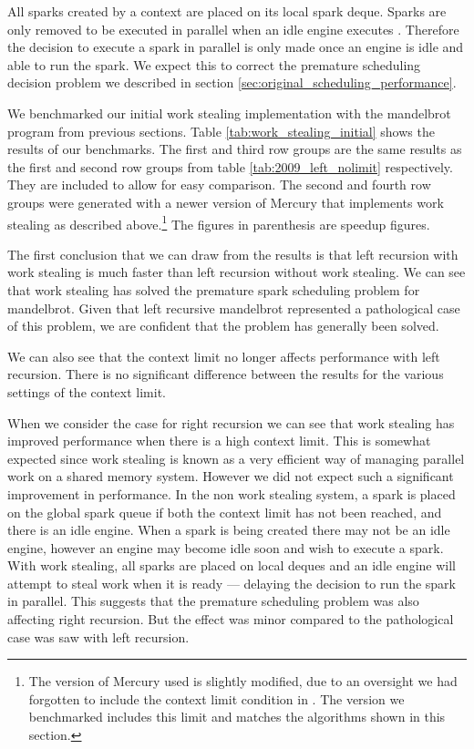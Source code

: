 All sparks created by a context are placed on its local spark deque.
Sparks are only removed to be executed in parallel when an idle engine
executes \trystealspark.
Therefore
the decision to execute a spark in parallel is only made once an engine is
idle and able to run the spark.
We expect this to correct the premature scheduling decision problem we
described in section \ref{sec:original_scheduling_performance}.



We benchmarked our initial work stealing implementation with the mandelbrot
program from previous sections.
Table \ref{tab:work_stealing_initial} shows the results of our benchmarks.
The first and third row groups are the same results as the first and second
row groups from table \ref{tab:2009_left_nolimit} respectively.
They are included to allow for easy comparison.
The second and fourth row groups were generated with a newer version of
Mercury that implements work stealing as described above.\footnote{
    The version of Mercury used is slightly modified,
    due to an oversight we had forgotten to include the context limit
    condition in \idle.
    The version we benchmarked includes this limit and matches the
    algorithms shown in this section.}
The figures in parenthesis are speedup figures.

The first conclusion that we can draw from the results is that
left recursion with work stealing is much faster than left recursion without
work stealing.
We can see that work stealing has solved the premature spark scheduling problem
for mandelbrot.
Given that left recursive mandelbrot represented a pathological case of this
problem,
we are confident that the problem has generally been solved.

We can also see that the context limit no longer affects performance
with left recursion.
There is no significant difference between the results for the various
settings of the context limit.

When we consider the case for right recursion we can see that
work stealing has improved performance when there is a
high context limit.
This is somewhat expected since work stealing is known as a very
efficient way of managing parallel work on a shared memory system.
However we did not expect such a significant improvement in
performance.
In the non work stealing system,
a spark is placed on the global spark queue if both the context limit has
not been reached,
and there is an idle engine.
When a spark is being created there may not be an idle engine,
however an engine may become idle soon and wish to execute a spark.
With work stealing,
all sparks are placed on local deques and an idle
engine will attempt to steal work when it is ready ---
delaying the decision to run the spark in parallel.
This suggests that the premature scheduling problem was also affecting right
recursion.
But the effect was minor compared to the pathological case was saw with left
recursion.

